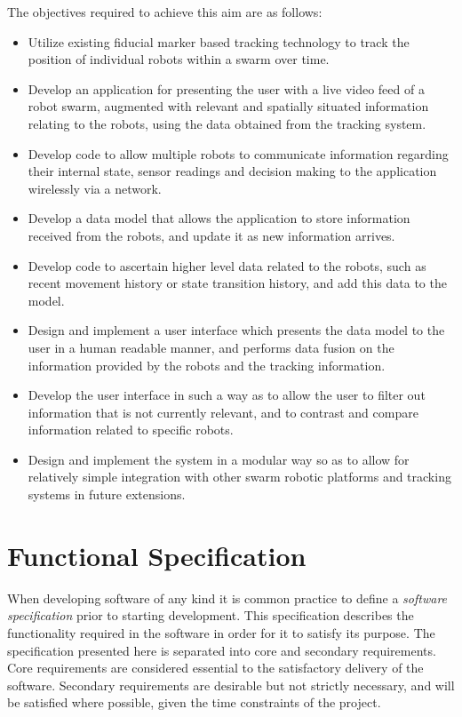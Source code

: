 The objectives required to achieve this aim are as follows:

\begin{itemize}
	\item Utilize existing fiducial marker based tracking technology to track the position of individual robots within a swarm over time.
	\item Develop an application for presenting the user with a live video feed of a robot swarm, augmented with relevant and spatially situated information relating to the robots, using the data obtained from the tracking system.
	\item Develop code to allow multiple robots to communicate information regarding their internal state, sensor readings and decision making to the application wirelessly via a network.
	\item Develop a data model that allows the application to store information received from the robots, and update it as new information arrives.
	\item Develop code to ascertain higher level data related to the robots, such as recent movement history or state transition history, and add this data to the model.
	\item Design and implement a user interface which presents the data model to the user in a human readable manner, and performs data fusion on the information provided by the robots and the tracking information.
	\item Develop the user interface in such a way as to allow the user to filter out information that is not currently relevant, and to contrast and compare information related to specific robots.
	\item Design and implement the system in a modular way so as to allow for relatively simple integration with other swarm robotic platforms and tracking systems in future extensions.
\end{itemize}


\section{Functional Specification} \label{FunctionalSpecification}
When developing software of any kind it is common practice to define a \textit{software specification} prior to starting development. This specification describes the functionality required in the software in order for it to satisfy its purpose. The specification presented here is separated into core and secondary requirements. Core requirements are considered essential to the satisfactory delivery of the software. Secondary requirements are desirable but not strictly necessary, and will be satisfied where possible, given the time constraints of the project.

